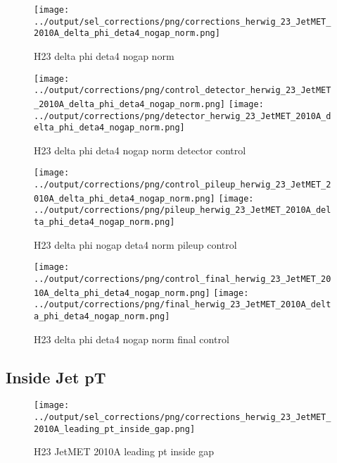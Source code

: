 \documentclass[11pt]{book}
\begin{document}
\begin{figure}[ht]
\centering
\texttt{[image: ../output/sel\_corrections/png/corrections\_herwig\_23\_JetMET\_2010A\_delta\_phi\_deta4\_nogap\_norm.png]}
\caption{H23 delta phi deta4 nogap norm}
\label{fig:H23_JetMET_2010A_delta_phi_deta4_nogap_norm}
\end{figure}

\begin{figure}[ht]
\centering
\texttt{[image: ../output/corrections/png/control\_detector\_herwig\_23\_JetMET\_2010A\_delta\_phi\_deta4\_nogap\_norm.png]}
\texttt{[image: ../output/corrections/png/detector\_herwig\_23\_JetMET\_2010A\_delta\_phi\_deta4\_nogap\_norm.png]}
\caption{H23 delta phi deta4 nogap norm detector control}
\label{fig:H23_JetMET_2010A_delta_phi_deta4_nogap_norm_detector_control}
\end{figure}

\begin{figure}[ht]
\centering
\texttt{[image: ../output/corrections/png/control\_pileup\_herwig\_23\_JetMET\_2010A\_delta\_phi\_deta4\_nogap\_norm.png]}
\texttt{[image: ../output/corrections/png/pileup\_herwig\_23\_JetMET\_2010A\_delta\_phi\_deta4\_nogap\_norm.png]}
\caption{H23 delta phi nogap deta4 norm pileup control}
\label{fig:H23_JetMET_2010A_delta_phi_deta4_nogap_norm_pileup_control}
\end{figure}


\begin{figure}[ht]
\centering
\texttt{[image: ../output/corrections/png/control\_final\_herwig\_23\_JetMET\_2010A\_delta\_phi\_deta4\_nogap\_norm.png]}
\texttt{[image: ../output/corrections/png/final\_herwig\_23\_JetMET\_2010A\_delta\_phi\_deta4\_nogap\_norm.png]}
\caption{H23 delta phi deta4 nogap norm final control}
\label{fig:H23_JetMET_2010A_delta_phi_deta4_nogap_norm_final_control}
\end{figure}

\clearpage
\subsection{Inside Jet pT}
\begin{figure}[ht]
\centering
\texttt{[image: ../output/sel\_corrections/png/corrections\_herwig\_23\_JetMET\_2010A\_leading\_pt\_inside\_gap.png]}
\caption{H23 JetMET 2010A leading pt inside gap}
\label{fig:H23_JetMET_2010A_leading_pt_inside_gap}
\end{figure}
\end{document}
